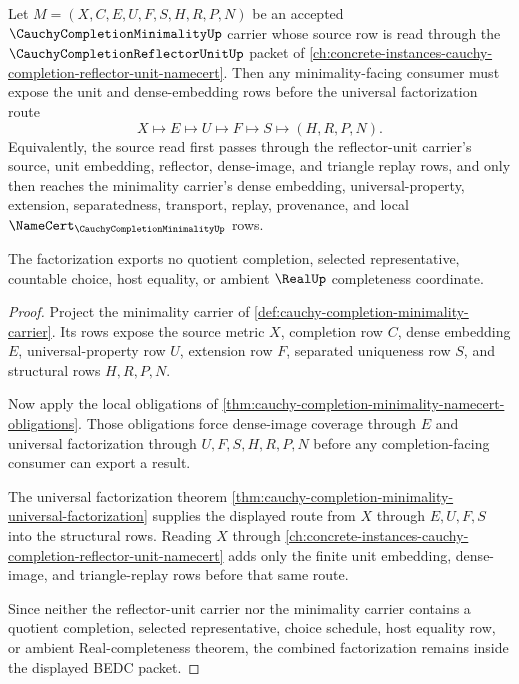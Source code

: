 \begin{theorem}
\label{thm:cauchy-completion-minimality-reflector-unit}
Let $M=(X,C,E,U,F,S,H,R,P,N)$ be an accepted $\CauchyCompletionMinimalityUp$ carrier whose source row is read through the $\CauchyCompletionReflectorUnitUp$ packet of \autoref{ch:concrete-instances-cauchy-completion-reflector-unit-namecert}. Then any minimality-facing consumer must expose the unit and dense-embedding rows before the universal factorization route
$$
X\longmapsto E\longmapsto U\longmapsto F\longmapsto S\longmapsto(H,R,P,N).
$$
Equivalently, the source read first passes through the reflector-unit carrier's source, unit embedding, reflector, dense-image, and triangle replay rows, and only then reaches the minimality carrier's dense embedding, universal-property, extension, separatedness, transport, replay, provenance, and local $\NameCert_{\CauchyCompletionMinimalityUp}$ rows.

The factorization exports no quotient completion, selected representative, countable choice, host equality, or ambient $\RealUp$ completeness coordinate.
\end{theorem}
\begin{proof}
Project the minimality carrier of \autoref{def:cauchy-completion-minimality-carrier}. Its rows expose the source metric $X$, completion row $C$, dense embedding $E$, universal-property row $U$, extension row $F$, separated uniqueness row $S$, and structural rows $H,R,P,N$.

Now apply the local obligations of \autoref{thm:cauchy-completion-minimality-namecert-obligations}. Those obligations force dense-image coverage through $E$ and universal factorization through $U,F,S,H,R,P,N$ before any completion-facing consumer can export a result.

The universal factorization theorem \autoref{thm:cauchy-completion-minimality-universal-factorization} supplies the displayed route from $X$ through $E,U,F,S$ into the structural rows. Reading $X$ through \autoref{ch:concrete-instances-cauchy-completion-reflector-unit-namecert} adds only the finite unit embedding, dense-image, and triangle-replay rows before that same route.

Since neither the reflector-unit carrier nor the minimality carrier contains a quotient completion, selected representative, choice schedule, host equality row, or ambient Real-completeness theorem, the combined factorization remains inside the displayed BEDC packet.
\end{proof}

